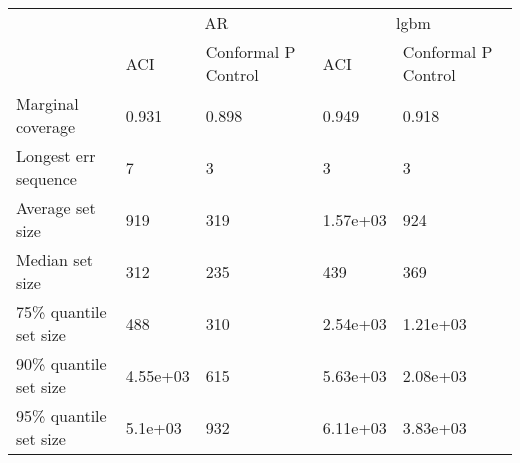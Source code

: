 \begin{tabular}{lllll}
\toprule
& \multicolumn{2}{c}{AR}& \multicolumn{2}{c}{lgbm} \\
& ACI & Conformal P Control & ACI & Conformal P Control \\
\midrule
Marginal coverage & 0.931 & 0.898 & 0.949 & 0.918 \\
Longest err sequence & 7 & 3 & 3 & 3 \\
Average set size & 919 & 319 & 1.57e+03 & 924 \\
Median set size & 312 & 235 & 439 & 369 \\
75\% quantile set size & 488 & 310 & 2.54e+03 & 1.21e+03 \\
90\% quantile set size & 4.55e+03 & 615 & 5.63e+03 & 2.08e+03 \\
95\% quantile set size & 5.1e+03 & 932 & 6.11e+03 & 3.83e+03 \\
\bottomrule
\end{tabular}
